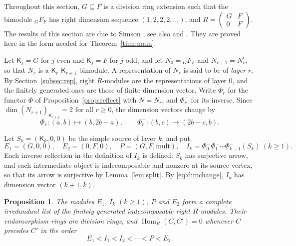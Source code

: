 \documentclass[11pt,a4paper]{amsart}
\newtheorem{proposition}[theorem]{Proposition}
\numberwithin{equation}{section}
\newcommand{\Hom}{\operatorname{Hom}}
\newcommand{\Ksf}{\mathsf{K}}
\newcommand{\rr}{\mathrm{r}}
\begin{document}
Throughout this section, $G\subseteq F$ is a division ring extension such that the bimodule ${}_GF_F$ has right dimension sequence $(1,2,2,2,\dots)$, and $R=\left(\begin{smallmatrix}G&F\\0&F\end{smallmatrix}\right)$. The results of this section are due to Simson \cite{Si97}; see also \cite[Section 6]{Ga18} and \cite[Section 1]{Sa}. They are proved here in the form needed for Theorem~\ref{thm:main}.

Let $\Ksf_j=G$ for $j$ even and $\Ksf_j=F$ for $j$ odd, and let $N_0={}_GF_F$ and $N_{r+1}=N_r^{\rr}$, so that $N_r$ is a $\Ksf_r$-$\Ksf_{r+1}$-bimodule. A representation of $N_r$ is said to be of \emph{layer} $r$. By Section~\ref{subsec:rep}, right $R$-modules are the representations of layer $0$, and the finitely generated ones are those of finite dimension vector. Write $\Phi_r$ for the functor $\Phi$ of Proposition~\ref{prop:reflect} with $N=N_r$, and $\Phi_r^-$ for its inverse. Since $\dim(N_{r+1})_{\Ksf_{r+2}}=2$ for all $r\ge0$, the dimension vectors change by
\begin{equation}\label{eq:dimchange}
\Phi_r\colon(a,b)\mapsto(b,2b-a),\qquad \Phi_r^-\colon(b,c)\mapsto(2b-c,b).
\end{equation}

Let $S_k=(\Ksf_k,0,0)$ be the simple source of layer $k$, and put
\[
E_1=(G,0,0),\quad E_2=(0,F,0),\quad P=(G,F,\text{mult}),\quad I_k=\Phi_0^-\Phi_1^-\cdots\Phi_{k-1}^-(S_k)\ (k\ge1).
\]
Each inverse reflection in the definition of $I_k$ is defined: $S_k$ has surjective arrow, and each intermediate object is indecomposable and nonzero at its source vertex, so that its arrow is surjective by Lemma~\ref{lem:split}. By \eqref{eq:dimchange}, $I_k$ has dimension vector $(k+1,k)$.

\begin{proposition}\label{prop:class}
The modules $E_1$, $I_k$ $(k\ge1)$, $P$ and $E_2$ form a complete irredundant list of the finitely generated indecomposable right $R$-modules. Their endomorphism rings are division rings, and $\Hom_R(C,C')=0$ whenever $C$ precedes $C'$ in the order
\begin{equation}\label{eq:order}
E_1<I_1<I_2<\cdots<P<E_2.
\end{equation}
\end{proposition}
\end{document}
